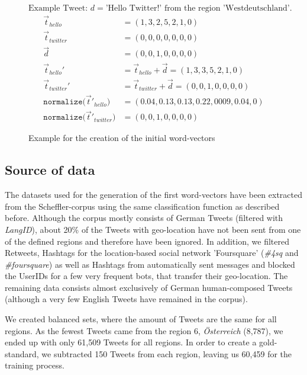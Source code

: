 \documentclass[../Main.tex]{subfiles}
\begin{document}
\begin{figure}
\centering $\textrm{Example Tweet: } d = \textrm{'Hello Twitter!'} \textrm{ from the region 'Westdeutschland'.}$
 \begin{align*}
    \vec{t}_{hello} &= (1,3,2,5,2,1,0) \\
     \vec{t}_{twitter} &= (0,0,0,0,0,0,0) \\
      \vec{d} &= (0,0,1,0,0,0,0) \\
     \vec{t}_{hello}' &= \vec{t}_{hello} + \vec{d} =  (1,3,3,5,2,1,0) \\
    \vec{t}_{twitter} ' &= \vec{t}_{twitter} + \vec{d} = (0,0,1,0,0,0,0) \\
     \texttt{normalize(}\vec{t}'_{hello}\texttt{)} &= (0.04, 0.13, 0.13, 0.22, 0009, 0.04, 0) \\
     \texttt{normalize(}\vec{t}'_{twitter}\texttt{)} &= (0,0,1,0,0,0,0)
  \end{align*}
  \caption{Example for the creation of the initial word-vectors}
  \label{geo_example1}
\end{figure}

\subsection{Source of data}
The datasets used for the generation of the first word-vectors have been extracted from the Scheffler-corpus using the same classification function as described before. Although the corpus mostly consists of German Tweets (filtered with \emph{LangID}), about 20\% of the Tweets with geo-location have not been sent from one of the defined regions and therefore have been ignored. In addition, we filtered Retweets, Hashtags for the location-based social network 'Foursquare' (\emph{\#4sq} and \emph{\#foursquare}) as well as Hashtags from automatically sent messages and blocked the UserIDs for a few very frequent bots, that transfer their geo-location. The remaining data consists almost exclusively of German human-composed Tweets (although a very few English Tweets have remained in the corpus).

We created balanced sets, where the amount of Tweets are the same for all regions. As the fewest Tweets came from the region 6, \textit{Österreich} (8,787), we ended up with only 61,509 Tweets for all regions.  
In order to create a gold-standard, we subtracted 150 Tweets from each region, leaving us 60,459 for the training process.
\end{document}
